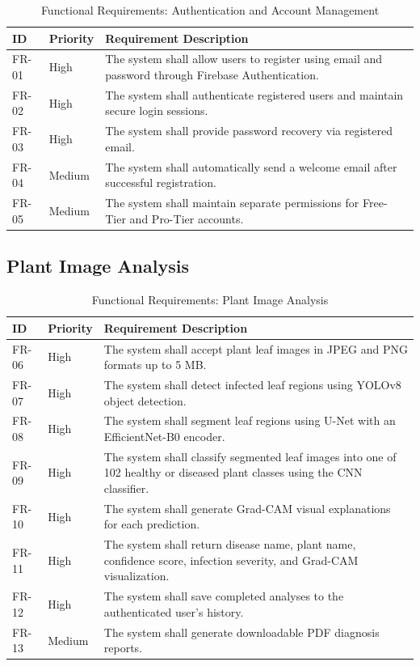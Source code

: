 \begin{table}[H]
\centering
\caption{Functional Requirements: Authentication and Account Management}
\label{tab:fr_auth}
\renewcommand{\arraystretch}{1.4}
\begin{tabularx}{\textwidth}{l l X}
\toprule
\textbf{ID} & \textbf{Priority} & \textbf{Requirement Description} \\
\midrule
FR-01 & High & The system shall allow users to register using email and password through Firebase Authentication.\\
FR-02 & High & The system shall authenticate registered users and maintain secure login sessions.\\
FR-03 & High & The system shall provide password recovery via registered email.\\
FR-04 & Medium & The system shall automatically send a welcome email after successful registration.\\
FR-05 & Medium & The system shall maintain separate permissions for Free-Tier and Pro-Tier accounts.\\
\bottomrule
\end{tabularx}
\end{table}

\subsection{Plant Image Analysis}
\label{subsec:fr_analysis}

\begin{table}[H]
\centering
\caption{Functional Requirements: Plant Image Analysis}
\label{tab:fr_analysis}
\renewcommand{\arraystretch}{1.4}
\begin{tabularx}{\textwidth}{l l X}
\toprule
\textbf{ID} & \textbf{Priority} & \textbf{Requirement Description} \\
\midrule
FR-06 & High & The system shall accept plant leaf images in JPEG and PNG formats up to 5 MB.\\
FR-07 & High & The system shall detect infected leaf regions using YOLOv8 object detection.\\
FR-08 & High & The system shall segment leaf regions using U-Net with an EfficientNet-B0 encoder.\\
FR-09 & High & The system shall classify segmented leaf images into one of 102 healthy or diseased plant classes using the CNN classifier.\\
FR-10 & High & The system shall generate Grad-CAM visual explanations for each prediction.\\
FR-11 & High & The system shall return disease name, plant name, confidence score, infection severity, and Grad-CAM visualization.\\
FR-12 & High & The system shall save completed analyses to the authenticated user's history.\\
FR-13 & Medium & The system shall generate downloadable PDF diagnosis reports.\\
\bottomrule
\end{tabularx}
\end{table}


